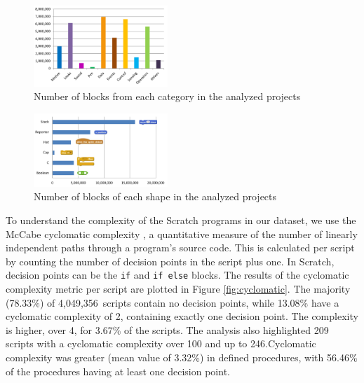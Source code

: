 \documentclass{sig-alternate}
\newcommand{\nscripts}{4,049,356}
\begin{document}
\begin{figure}
	\centering
	\includegraphics[width=0.45\textwidth]{fig/charts/16Categories}
	\caption{Number of blocks from each category in the analyzed projects}
	\label{fig:categories}
\end{figure}
\begin{figure}
	\centering
	\includegraphics[width=0.45\textwidth]{fig/charts/16Shapes}
	\caption{Number of blocks of each shape in the analyzed projects}
	\label{fig:shapes}
\end{figure}

To understand the complexity of the Scratch programs in our dataset, we use the McCabe cyclomatic complexity \cite{mcCabe76},  a quantitative measure of the number of linearly independent paths through a program's source code. This is calculated per script by counting the number of decision points in the script plus one. In Scratch, decision points can be the \texttt{if} and \texttt{if else} blocks. The results of the cyclomatic complexity metric per script are plotted in Figure \ref{fig:cyclomatic}. The majority (78.33\%) of \nscripts~scripts contain no decision points, while 13.08\% have a cyclomatic complexity of 2, containing exactly one decision point. The complexity is higher, over 4, for 3.67\% of the scripts. The analysis also highlighted 209 scripts with a cyclomatic complexity over 100 and up to 246.\footnotemark[\ref{repo}] Cyclomatic complexity was greater (mean value of 3.32\%) in defined procedures, with 56.46\% of the procedures having at least one decision point.

\noindent
{}
\end{document}
